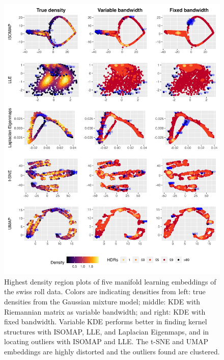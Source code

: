 \documentclass[11pt,a4paper,]{article}
\begin{document}
\begin{figure}

{\centering \includegraphics[width=0.95\linewidth]{figures/Swiss Roll_outliers_comparison_4ml_3cases_riem0_08} 

}

\caption{Highest density region plots of five manifold learning embeddings of the swiss roll data. Colors are indicating densities from left: true densities from the Gaussian mixture model; middle: KDE with Riemannian matrix as variable bandwidth; and right: KDE with fixed bandwidth. Variable KDE performs better in finding kernel structures with ISOMAP, LLE, and Laplacian Eigenmaps, and in locating outliers with ISOMAP and LLE. The t-SNE and UMAP embeddings are highly distorted and the outliers found are clustered.}\label{fig:sroutliers}
\end{figure}
\end{document}
